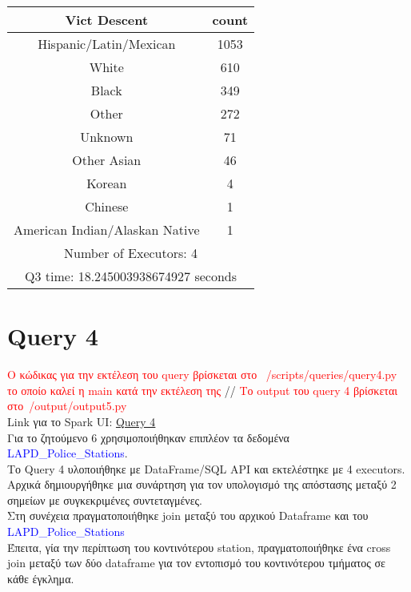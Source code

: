 \documentclass{article}
\begin{document}
\begin{center}
\begin{tabular}{|c|c|}
\hline
\textbf{Vict Descent} & \textbf{count} \\
\hline
Hispanic/Latin/Mexican & 1053 \\
White & 610 \\
Black & 349 \\
Other & 272 \\
Unknown & 71 \\
Other Asian & 46 \\
Korean & 4 \\
Chinese & 1 \\
American Indian/Alaskan Native & 1 \\
\hline
\multicolumn{2}{|c|}{Number of Executors: 4} \\
\multicolumn{2}{|c|}{Q3 time: 18.245003938674927 seconds} \\
\hline
\end{tabular}
\end{center}

\vspace{3mm}

\section{Query 4}

\textcolor{red}{Ο κώδικας για την εκτέλεση του query βρίσκεται στο  /scripts/queries/query4.py το οποίο καλεί η main κατά την εκτέλεση της} //
\textcolor{red}{Το output του query 4 βρίσκεται στο /output/output5.py} \\
Link για το Spark UI: 
\href{http://83.212.81.191:18080/history/application_1705357398960_0017/jobs/} {Query 4} \\

Για το ζητούμενο 6 χρησιμοποιήθηκαν επιπλέον τα δεδομένα \textcolor{blue}{LAPD\_Police\_Stations}. \\
Το Query 4 υλοποιήθηκε με DataFrame/SQL API και εκτελέστηκε με 4 executors.  \\
Αρχικά δημιουργήθηκε μια συνάρτηση για τον υπολογισμό της απόστασης μεταξύ 2 σημείων με 
συγκεκριμένες συντεταγμένες. \\
Στη συνέχεια πραγματοποιήθηκε join μεταξύ του αρχικού Dataframe και του \textcolor{blue}{LAPD\_Police\_Stations}\\
Έπειτα, γία την περίπτωση του κοντινότερου station, πραγματοποιήθηκε ένα cross join μεταξύ των δύο dataframe
για τον εντοπισμό του κοντινότερου τμήματος σε κάθε έγκλημα. 
\end{document}
